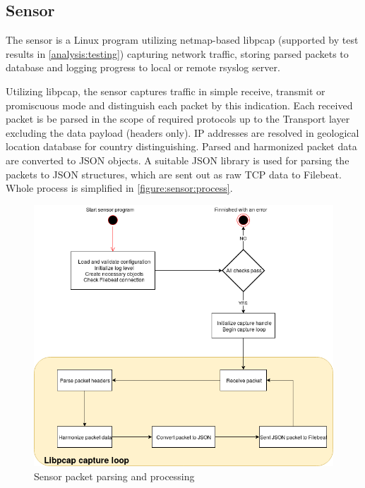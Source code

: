 \documentclass[12pt,a4paper,twoside]{book}
\begin{document}
        \subsection{Sensor} \label{solution:design:sensor}
            The sensor is a Linux program utilizing netmap-based libpcap (supported by test results in \autoref{analysis:testing}) capturing network traffic, storing parsed packets to database and logging progress to local or remote rsyslog server.\par
            Utilizing libpcap, the sensor captures traffic in simple receive, transmit or promiscuous mode and distinguish each packet by this indication. Each received packet is be parsed in the scope of required protocols up to the Transport layer excluding the data payload (headers only). IP addresses are resolved in geological location database for country distinguishing. Parsed and harmonized packet data are converted to JSON objects. A suitable JSON library is used for parsing the packets to JSON structures, which are sent out as raw TCP data to Filebeat. Whole process is simplified in \autoref{figure:sensor:process}.
                \begin{figure}[h]
                    \centering
                    \includegraphics[scale=0.35]{sensor_process}
                    \caption{Sensor packet parsing and processing}
                    \label{figure:sensor:process}
                \end{figure}
\end{document}
